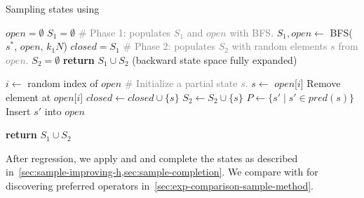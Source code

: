 \documentclass[ppgc,diss,english]{iiufrgs}
\begin{document}
\begin{algorithm}[tb]
\caption{Sampling states using \bfsrs}
\label{alg:sampling-po}
\begin{algorithmic}[1]
  \State $open = \emptyset$
  \State $S_{1} = \emptyset$
  \State \textcolor{gray}{\# Phase 1: populates $S_{1}$ and $open$ with BFS.}
  \State $S_{1}, open \gets$ BFS($s^{*}$, $open$, $k_1N$)
  \State $closed = S_{1}$
  \State \textcolor{gray}{\# Phase 2: populates $S_{2}$ with random elements $s$ from $open$.}
  \State $S_{2} = \emptyset$
      \State \textbf{return} $S_{1} \cup S_{2}$ (backward state space fully expanded)
    \EndIf

    \State $i \gets$ random index of $open$
    \State \textcolor{gray}{\# Initialize a partial state $s$.}
    \State $s \gets$ $open$[$i$]
    \State Remove element at $open$[$i$]
    \State $closed \gets closed \cup \{s\}$
    \State $S_{2} \gets S_{2} \cup \{s\}$
    \State $P \gets \{s' \mid s' \in pred(s)\}$
        \State Insert $s'$ into $open$
      \EndIf
    \EndFor
  \EndWhile

  \State \textbf{return} $S_{1} \cup S_{2}$
\EndProcedure
\end{algorithmic}
\end{algorithm}

%
%

After regression, we apply \sai and \sui and complete the states as described in~\cref{sec:sample-improving-h,sec:sample-completion}. We compare \bfsrs with \bfsrw for discovering preferred operators in~\cref{sec:exp-comparison-sample-method}.
\end{document}
